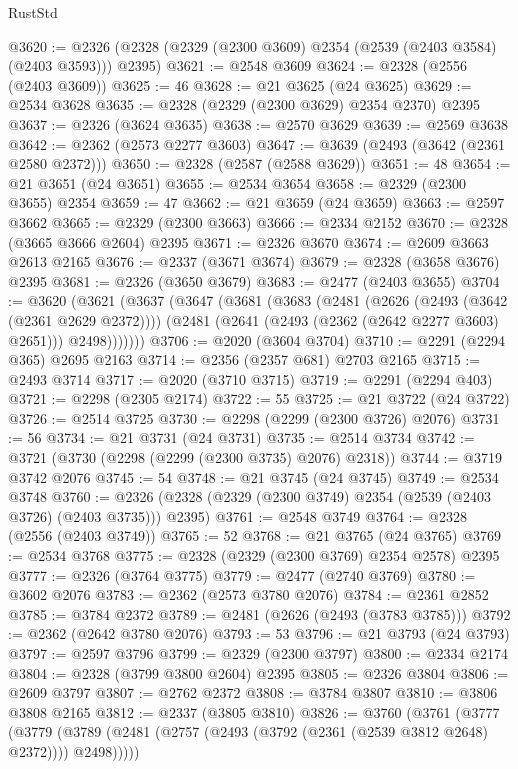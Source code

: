 \begin{lexlean}{RustStd}
\begin{coremodule}
@3620 := @2326 (@2328 (@2329 (@2300 @3609) @2354 (@2539 (@2403 @3584) (@2403 @3593))) @2395)
@3621 := @2548 @3609
@3624 := @2328 (@2556 (@2403 @3609))
@3625 := 46
@3628 := @21 @3625 (@24 @3625)
@3629 := @2534 @3628
@3635 := @2328 (@2329 (@2300 @3629) @2354 @2370) @2395
@3637 := @2326 (@3624 @3635)
@3638 := @2570 @3629
@3639 := @2569 @3638
@3642 := @2362 (@2573 @2277 @3603)
@3647 := @3639 (@2493 (@3642 (@2361 @2580 @2372)))
@3650 := @2328 (@2587 (@2588 @3629))
@3651 := 48
@3654 := @21 @3651 (@24 @3651)
@3655 := @2534 @3654
@3658 := @2329 (@2300 @3655) @2354
@3659 := 47
@3662 := @21 @3659 (@24 @3659)
@3663 := @2597 @3662
@3665 := @2329 (@2300 @3663)
@3666 := @2334 @2152
@3670 := @2328 (@3665 @3666 @2604) @2395
@3671 := @2326 @3670
@3674 := @2609 @3663 @2613 @2165
@3676 := @2337 (@3671 @3674)
@3679 := @2328 (@3658 @3676) @2395
@3681 := @2326 (@3650 @3679)
@3683 := @2477 (@2403 @3655)
@3704 := @3620
    (@3621
      (@3637
        (@3647
          (@3681
            (@3683
              (@2481
                (@2626 (@2493 (@3642 (@2361 @2629 @2372))))
                (@2481 (@2641 (@2493 (@2362 (@2642 @2277 @3603) @2651))) @2498)))))))
@3706 := @2020 (@3604 @3704)
@3710 := @2291 (@2294 @365) @2695 @2163
@3714 := @2356 (@2357 @681) @2703 @2165
@3715 := @2493 @3714
@3717 := @2020 (@3710 @3715)
@3719 := @2291 (@2294 @403)
@3721 := @2298 (@2305 @2174)
@3722 := 55
@3725 := @21 @3722 (@24 @3722)
@3726 := @2514 @3725
@3730 := @2298 (@2299 (@2300 @3726) @2076)
@3731 := 56
@3734 := @21 @3731 (@24 @3731)
@3735 := @2514 @3734
@3742 := @3721 (@3730 (@2298 (@2299 (@2300 @3735) @2076) @2318))
@3744 := @3719 @3742 @2076
@3745 := 54
@3748 := @21 @3745 (@24 @3745)
@3749 := @2534 @3748
@3760 := @2326 (@2328 (@2329 (@2300 @3749) @2354 (@2539 (@2403 @3726) (@2403 @3735))) @2395)
@3761 := @2548 @3749
@3764 := @2328 (@2556 (@2403 @3749))
@3765 := 52
@3768 := @21 @3765 (@24 @3765)
@3769 := @2534 @3768
@3775 := @2328 (@2329 (@2300 @3769) @2354 @2578) @2395
@3777 := @2326 (@3764 @3775)
@3779 := @2477 (@2740 @3769)
@3780 := @3602 @2076
@3783 := @2362 (@2573 @3780 @2076)
@3784 := @2361 @2852
@3785 := @3784 @2372
@3789 := @2481 (@2626 (@2493 (@3783 @3785)))
@3792 := @2362 (@2642 @3780 @2076)
@3793 := 53
@3796 := @21 @3793 (@24 @3793)
@3797 := @2597 @3796
@3799 := @2329 (@2300 @3797)
@3800 := @2334 @2174
@3804 := @2328 (@3799 @3800 @2604) @2395
@3805 := @2326 @3804
@3806 := @2609 @3797
@3807 := @2762 @2372
@3808 := @3784 @3807
@3810 := @3806 @3808 @2165
@3812 := @2337 (@3805 @3810)
@3826 := @3760
    (@3761
      (@3777
        (@3779 (@3789 (@2481 (@2757 (@2493 (@3792 (@2361 (@2539 @3812 @2648) @2372)))) @2498)))))

\end{coremodule}
\end{lexlean}
